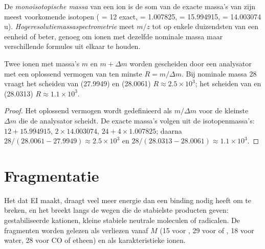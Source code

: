 \begin{definition}\label{def:b2:mass-spec-atomic:exact-mass}
De \emph{monoisotopische massa} van een ion is de som van de exacte massa's van zijn
meest voorkomende isotopen ( = 12 exact,  = 1.007825,  = 15.994915,
 = 14.003074 u). \emph{Hogeresolutiemassaspectrometrie}
meet $m/z$ tot op enkele duizendsten van een eenheid of beter, genoeg om ionen met dezelfde
nominale massa maar verschillende formules uit elkaar te houden.
\end{definition}

\begin{proposition}\label{prop:b2:mass-spec-atomic:resolving}
Twee ionen met massa's $m$ en $m + \Delta m$ worden gescheiden door een analysator met een oplossend vermogen van ten minste
$R = m/\Delta m$. Bij nominale massa 28 vraagt het scheiden van  (27.9949) en  (28.0061) $R
\approx 2.5 \times 10^3$; het scheiden van  en  (28.0313) $R \approx 1.1 \times 10^3$.
\end{proposition}

\begin{proof}
Het oplossend vermogen wordt gedefinieerd als $m/\Delta m$ voor de kleinste $\Delta m$ die de analysator scheidt. De
exacte massa's volgen uit de isotopenmassa's: $12 + 15.994915$, $2 \times 14.003074$, $24 + 4 \times
1.007825$; daarna $28/(28.0061 - 27.9949) \approx 2.5 \times 10^3$ en $28/(28.0313 - 28.0061) \approx
1.1 \times 10^3$.
\end{proof}

\section{Fragmentatie}

Het  dat EI maakt, draagt veel meer energie dan een binding nodig heeft om te breken, en het breekt langs
de wegen die de stabielste producten geven: gestabiliseerde kationen, kleine stabiele neutrale moleculen of
radicalen. De fragmenten worden gelezen als verliezen vanaf $M$ (15 voor , 29 voor  of , 18
voor water, 28 voor CO of etheen) en als karakteristieke ionen.


